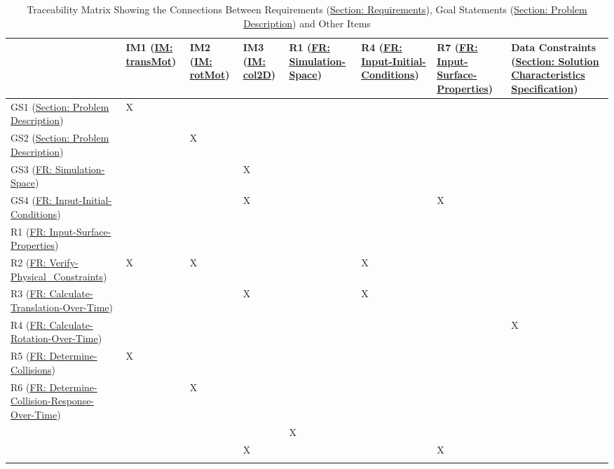 \documentclass[12pt]{article}
\begin{document}
\begin{longtable}{l l l l l l l l}
\toprule
 & IM1 (\hyperref[IM:transMot]{IM: transMot}) & IM2 (\hyperref[IM:rotMot]{IM: rotMot}) & IM3 (\hyperref[IM:col2D]{IM: col2D}) & R1 (\hyperref[reqSS]{FR: Simulation-Space}) & R4 (\hyperref[reqIIC]{FR: Input-Initial-Conditions}) & R7 (\hyperref[reqISP]{FR: Input-Surface-Properties}) & Data Constraints (\hyperref[Sec:SolCharSpec]{Section: Solution Characteristics Specification})
\\
\midrule
\endhead
GS1 (\hyperref[Sec:ProbDesc]{Section: Problem Description}) & X &  &  &  &  &  & 
\\
GS2 (\hyperref[Sec:ProbDesc]{Section: Problem Description}) &  & X &  &  &  &  & 
\\
GS3 (\hyperref[reqSS]{FR: Simulation-Space}) &  &  & X &  &  &  & 
\\
GS4 (\hyperref[reqIIC]{FR: Input-Initial-Conditions}) &  &  & X &  &  & X & 
\\
R1 (\hyperref[reqISP]{FR: Input-Surface-Properties}) &  &  &  &  &  &  & 
\\
R2 (\hyperref[reqVPC]{FR: Verify-Physical\_Constraints}) & X & X &  &  & X &  & 
\\
R3 (\hyperref[reqCTOT]{FR: Calculate-Translation-Over-Time}) &  &  & X &  & X &  & 
\\
R4 (\hyperref[reqCROT]{FR: Calculate-Rotation-Over-Time}) &  &  &  &  &  &  & X
\\
R5 (\hyperref[reqDC]{FR: Determine-Collisions}) & X &  &  &  &  &  & 
\\
R6 (\hyperref[reqDCROT]{FR: Determine-Collision-Response-Over-Time}) &  & X &  &  &  &  & 
\\
 &  &  &  & X &  &  & 
\\
 &  &  & X &  &  & X & 
\\
\bottomrule
\caption{Traceability Matrix Showing the Connections Between Requirements (\hyperref[Sec:Requirements]{Section: Requirements}), Goal Statements (\hyperref[Sec:ProbDesc]{Section: Problem Description}) and Other Items}
\label{Table:TraceyReqGoalsOther}
\end{longtable}
\end{document}
